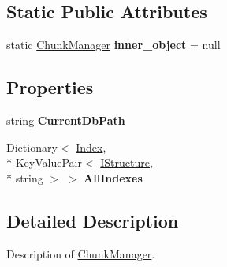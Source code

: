 \subsection*{Static Public Attributes}
\begin{DoxyCompactItemize}
\item 
\hypertarget{class_dwarf_d_b_1_1_chunk_manager_1_1_chunk_manager_a43d4aebedbb50fdfeb27840b3aa4849b}{static \hyperlink{class_dwarf_d_b_1_1_chunk_manager_1_1_chunk_manager}{Chunk\+Manager} {\bfseries inner\+\_\+object} = null}\label{class_dwarf_d_b_1_1_chunk_manager_1_1_chunk_manager_a43d4aebedbb50fdfeb27840b3aa4849b}

\end{DoxyCompactItemize}
\subsection*{Properties}
\begin{DoxyCompactItemize}
\item 
\hypertarget{class_dwarf_d_b_1_1_chunk_manager_1_1_chunk_manager_ab3d1c419f8c1c396ca43368f5f214614}{string {\bfseries Current\+Db\+Path}}\label{class_dwarf_d_b_1_1_chunk_manager_1_1_chunk_manager_ab3d1c419f8c1c396ca43368f5f214614}

\item 
\hypertarget{class_dwarf_d_b_1_1_chunk_manager_1_1_chunk_manager_a9adc3ce8d62f6341303c48e8dae3cc17}{Dictionary$<$ \hyperlink{class_dwarf_d_b_1_1_data_structures_1_1_index}{Index}, \\*
Key\+Value\+Pair$<$ \hyperlink{interface_dwarf_d_b_1_1_data_structures_1_1_i_structure}{I\+Structure}, \\*
string $>$ $>$ {\bfseries All\+Indexes}}\label{class_dwarf_d_b_1_1_chunk_manager_1_1_chunk_manager_a9adc3ce8d62f6341303c48e8dae3cc17}

\end{DoxyCompactItemize}


\subsection{Detailed Description}
Description of \hyperlink{class_dwarf_d_b_1_1_chunk_manager_1_1_chunk_manager}{Chunk\+Manager}. 



